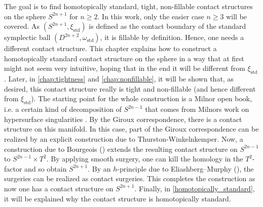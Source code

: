 The goal is to find homotopically standard, tight, non-fillable contact structures on the sphere $S^{2n+1}$ for $n \geq 2$.
In this work, only the easier case $n \geq 3$ will be covered.
As $(S^{2n+1}, \xi_\mathrm{std})$ is defined as the contact boundary of the standard symplectic ball $(D^{2n+2}, \omega_\mathrm{std})$,
it is fillable by definition.
Hence, one needs a different contact structure.
This chapter explains how to construct a homotopically standard contact structure on the sphere in a way that at first might not seem very intuitive,
hoping that in the end it will be different from $\xi_\mathrm{std}$.
Later, in \cref{chap:tightness} and \cref{chap:nonfillable}, it will be shown that, as desired, this contact structure really is tight and non-fillable 
(and hence different from $\xi_\mathrm{std}$).
The starting point for the whole construction is a Milnor open book, i.e. a certain kind of decomposition of $S^{2n-1}$ that comes from
Milnors work on hypersurface singularities \cite{Milnor69}.
By the Giroux correspondence, there is a contact structure on this manifold.
In this case, part of the Giroux correspondence can be realized by an explicit construction due to Thurston-Winkelnkemper.
Now, a construction due to Bourgeois (\cite{Bourgeois02}) extends the resulting contact structure on $S^{2n-1}$ to $S^{2n-1}\times T^2$.
By applying smooth surgery, one can kill the homology in the $T^2$-factor and so obtain $S^{2n+1}$.
By an $h$-principle due to Eliashberg--Murphy (\cite[section 12.4]{EM02}), the surgeries can be realized as contact surgeries.
This completes the construction as now one has a contact structure on $S^{2n+1}$.
Finally, in \cref{homotopically_standard}, it will be explained why the contact structure is homotopically standard.